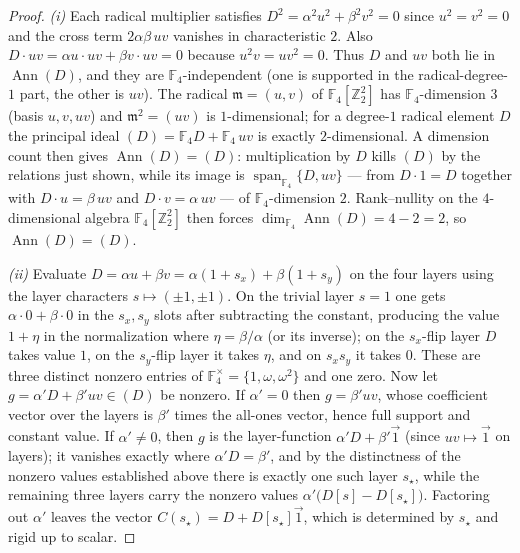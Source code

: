\documentclass[11pt]{article}
\newcommand{\Z}{\mathbb{Z}}
\newcommand{\F}[1]{\mathbb{F}_{#1}}
\DeclareMathOperator{\Ann}{Ann}
\newcommand{\sx}{s_x}
\newcommand{\sy}{s_y}
\theoremstyle{plain}
\theoremstyle{definition}
\theoremstyle{remark}
\begin{document}
\begin{proof}
\emph{(i)} Each radical multiplier satisfies $D^2=\alpha^2 u^2+\beta^2
v^2=0$ since $u^2=v^2=0$ and the cross term $2\alpha\beta\,uv$ vanishes in
characteristic $2$. Also $D\cdot uv=\alpha u\cdot uv+\beta v\cdot uv=0$ because
$u^2v=uv^2=0$. Thus $D$ and $uv$ both lie in $\Ann(D)$, and they are
$\F4$-independent (one is supported in the radical-degree-$1$ part, the other is
$uv$). The radical $\mathfrak m=(u,v)$ of $\F4[\Z_2^2]$ has $\F4$-dimension $3$
(basis $u,v,uv$) and $\mathfrak m^2=(uv)$ is $1$-dimensional; for a degree-$1$
radical element $D$ the principal ideal $(D)=\F4 D+\F4\,uv$ is exactly
$2$-dimensional. A dimension count then gives $\Ann(D)=(D)$: multiplication by
$D$ kills $(D)$ by the relations just shown, while its image is
$\operatorname{span}_{\F4}\{D,uv\}$ --- from $D\cdot 1=D$ together with
$D\cdot u=\beta\,uv$ and $D\cdot v=\alpha\,uv$ --- of $\F4$-dimension $2$. Rank--nullity
on the $4$-dimensional algebra $\F4[\Z_2^2]$ then forces $\dim_{\F4}\Ann(D)=4-2=2$,
so $\Ann(D)=(D)$.

\emph{(ii)} Evaluate $D=\alpha u+\beta v=\alpha(1+\sx)+\beta(1+\sy)$ on the four
layers using the layer characters $s\mapsto(\pm1,\pm1)$. On the trivial layer
$s=1$ one gets $\alpha\cdot 0+\beta\cdot 0$ in the $\sx,\sy$ slots after
subtracting the constant, producing the value $1+\eta$ in the normalization where
$\eta=\beta/\alpha$ (or its inverse); on the $\sx$-flip layer $D$ takes value
$1$, on the $\sy$-flip layer it takes $\eta$, and on $\sx\sy$ it takes $0$. These
are three distinct nonzero entries of $\F4^\times=\{1,\omega,\omega^2\}$ and one
zero. Now let $g=\alpha'D+\beta'uv\in(D)$ be nonzero. If $\alpha'=0$ then
$g=\beta'uv$, whose coefficient vector over the layers is $\beta'$ times the
all-ones vector, hence full support and constant value. If $\alpha'\ne0$, then
$g$ is the layer-function $\alpha'D+\beta'\vec 1$ (since $uv\mapsto\vec 1$ on
layers); it vanishes exactly where $\alpha'D=\beta'$, and by the distinctness of the
nonzero values established above there is exactly one such layer $s_\star$, while the remaining three layers
carry the nonzero values $\alpha'\bigl(D[s]-D[s_\star]\bigr)$. Factoring out
$\alpha'$ leaves the vector $C(s_\star)=D+D[s_\star]\vec 1$, which is determined
by $s_\star$ and rigid up to scalar.


\end{proof}
\end{document}
